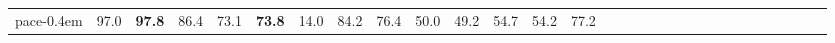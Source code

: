 \documentclass{article}
\begin{document}
\begin{table*}[]
\begin{tabular}{cc|cccccccccccccccccccccccccccc}
pace{-0.4em} & \hspace{-0.9em}97.0\hspace{-0.4em} & \hspace{-0.9em}\textbf{97.8}\hspace{-0.4em} & \hspace{-0.9em}86.4\hspace{-0.4em} & \hspace{-0.9em}73.1\hspace{-0.4em} & \hspace{-0.9em}\textbf{73.8}\hspace{-0.4em} & \hspace{-0.9em}14.0\hspace{-0.4em} & \hspace{-0.9em}84.2\hspace{-0.4em} & \hspace{-0.9em}76.4\hspace{-0.4em} & \hspace{-0.9em}50.0\hspace{-0.4em} & \hspace{-0.9em}49.2\hspace{-0.4em} & \hspace{-0.9em}54.7\hspace{-0.4em} & \hspace{-0.9em}54.2\hspace{-0.4em} & \hspace{-0.9em}77.2\hspace{-0.4em} 
        \\

\end{tabular}
\end{table*}
\end{document}
